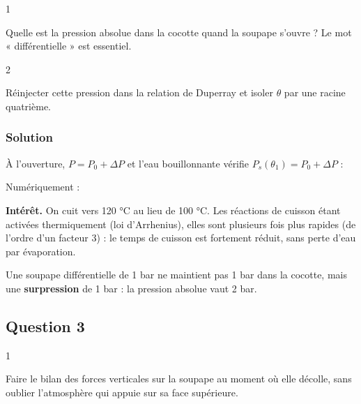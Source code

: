 \documentclass[11pt,a4paper]{article}
\newcommand{\equationajustee}[1]{%
  \sbox{\boiteequation}{$\displaystyle #1$}%
  \ifdim\wd\boiteequation>\linewidth
    \[\resizebox{\linewidth}{!}{\usebox{\boiteequation}}\]%
  \else
    \[#1\]%
  \fi}
\begin{document}
\begin{indication}{1}

Quelle est la pression absolue dans la cocotte quand la soupape s'ouvre ? Le mot « différentielle » est essentiel.

\end{indication}

\begin{indication}{2}

Réinjecter cette pression dans la relation de Duperray et isoler \(\theta\) par une racine quatrième.

\end{indication}

\hypertarget{solution-1}{%
\subsubsection{Solution}\label{solution-1}}

À l'ouverture, \(P=P_0+\Delta P\) et l'eau bouillonnante vérifie \(P_s(\theta_1)=P_0+\Delta P\) :

\equationajustee{\boxed{\theta_1=100\left(1+\frac{\Delta P}{P_0}\right)^{1/4}}}

Numériquement :

\equationajustee{\begin{aligned}
\theta_1&=100\times2^{1/4}\\
&\simeq\boxed{119\ ^\circ\mathrm C\ (392\ \mathrm K)}
\end{aligned}}

\textbf{Intérêt.} On cuit vers 120 °C au lieu de 100 °C. Les réactions de cuisson étant activées thermiquement (loi d'Arrhenius), elles sont plusieurs fois plus rapides (de l'ordre d'un facteur 3) : le temps de cuisson est fortement réduit, sans perte d'eau par évaporation.

\begin{piege}

Une soupape différentielle de 1 bar ne maintient pas 1 bar dans la cocotte, mais une \textbf{surpression} de 1 bar : la pression absolue vaut 2 bar.

\end{piege}

\hypertarget{question-3}{%
\subsection{Question 3}\label{question-3}}

\begin{indication}{1}

Faire le bilan des forces verticales sur la soupape au moment où elle décolle, sans oublier l'atmosphère qui appuie sur sa face supérieure.

\end{indication}
\end{document}
